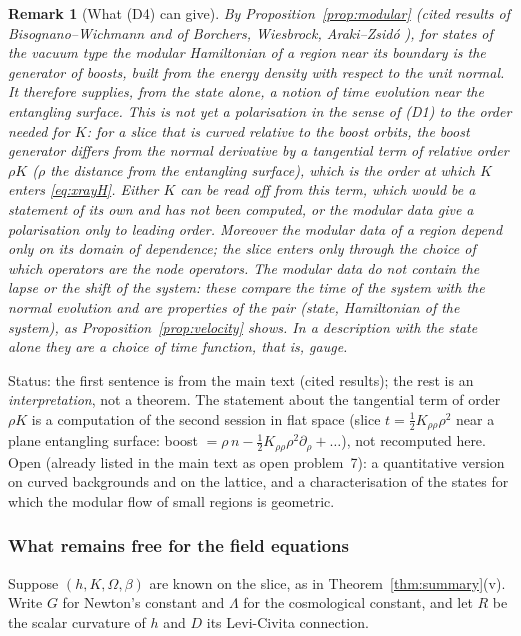 \documentclass[11pt,a4paper]{article}
\theoremstyle{stmt}
\theoremstyle{defn}
\theoremstyle{rmk}
\newtheorem{remark}[theorem]{Remark}
\numberwithin{equation}{section}
\newcommand{\status}[1]{\par\noindent\textsf{\small Status: #1}\par}
\begin{document}
{\begin{remark}[What \textup{(D4)} can give]
By Proposition~\ref{prop:modular} (cited results of Bisognano--Wichmann \cite{BW} and of Borchers, Wiesbrock, Araki--Zsid\'o \cite{Borchers,Wiesbrock,ArakiZsido}), for states of the vacuum type the modular Hamiltonian of a region near its boundary is the generator of boosts, built from the energy density with respect to the \emph{unit normal}. It therefore supplies, from the state alone, a notion of time evolution near the entangling surface. This is \emph{not} yet a polarisation in the sense of \textup{(D1)} to the order needed for $K$: for a slice that is curved relative to the boost orbits, the boost generator differs from the normal derivative by a tangential term of relative order $\rho K$ ($\rho$ the distance from the entangling surface), which is the order at which $K$ enters \eqref{eq:xrayH}. Either $K$ can be read off from this term, which would be a statement of its own and has not been computed, or the modular data give a polarisation only to leading order. Moreover the modular data of a region depend only on its domain of dependence; the slice enters only through the choice of which operators are the node operators. The modular data do not contain the lapse or the shift of the system: these compare the time of the system with the normal evolution and are properties of the pair (state, Hamiltonian of the system), as Proposition~\ref{prop:velocity} shows. In a description with the state alone they are a choice of time function, that is, gauge.
\end{remark}
\status{the first sentence is from the main text (cited results); the rest is an \emph{interpretation}, not a theorem. The statement about the tangential term of order $\rho K$ is a computation of the second session in flat space (slice $t=\tfrac12K_{\rho\rho}\rho^2$ near a plane entangling surface: boost $=\rho\,n-\tfrac12K_{\rho\rho}\rho^2\partial_\rho+\dots$), not recomputed here. Open (already listed in the main text as open problem~7): a quantitative version on curved backgrounds and on the lattice, and a characterisation of the states for which the modular flow of small regions is geometric.}

\subsubsection{What remains free for the field equations}

Suppose $(h,K,\Omega,\beta)$ are known on the slice, as in Theorem~\ref{thm:summary}(v). Write $G$ for Newton's constant and $\Lambda$ for the cosmological constant, and let $R$ be the scalar curvature of $h$ and $D$ its Levi-Civita connection.

}
\end{document}

